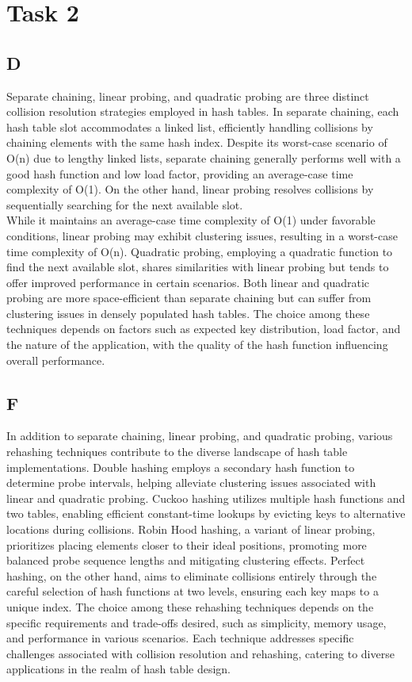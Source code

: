 \documentclass{article}
\begin{document}
\section{Task 2}

\subsection{D}

Separate chaining, linear probing, and quadratic probing are three distinct collision resolution strategies employed in hash tables. In separate chaining, each hash table slot accommodates a linked list, efficiently handling collisions by chaining elements with the same hash index. Despite its worst-case scenario of O(n) due to lengthy linked lists, separate chaining generally performs well with a good hash function and low load factor, providing an average-case time complexity of O(1). On the other hand, linear probing resolves collisions by sequentially searching for the next available slot. \\
While it maintains an average-case time complexity of O(1) under favorable conditions, linear probing may exhibit clustering issues, resulting in a worst-case time complexity of O(n). Quadratic probing, employing a quadratic function to find the next available slot, shares similarities with linear probing but tends to offer improved performance in certain scenarios. Both linear and quadratic probing are more space-efficient than separate chaining but can suffer from clustering issues in densely populated hash tables. The choice among these techniques depends on factors such as expected key distribution, load factor, and the nature of the application, with the quality of the hash function influencing overall performance.

\subsection{F}

In addition to separate chaining, linear probing, and quadratic probing, various rehashing techniques contribute to the diverse landscape of hash table implementations. Double hashing employs a secondary hash function to determine probe intervals, helping alleviate clustering issues associated with linear and quadratic probing. Cuckoo hashing utilizes multiple hash functions and two tables, enabling efficient constant-time lookups by evicting keys to alternative locations during collisions. Robin Hood hashing, a variant of linear probing, prioritizes placing elements closer to their ideal positions, promoting more balanced probe sequence lengths and mitigating clustering effects. Perfect hashing, on the other hand, aims to eliminate collisions entirely through the careful selection of hash functions at two levels, ensuring each key maps to a unique index. The choice among these rehashing techniques depends on the specific requirements and trade-offs desired, such as simplicity, memory usage, and performance in various scenarios. Each technique addresses specific challenges associated with collision resolution and rehashing, catering to diverse applications in the realm of hash table design.
\end{document}

